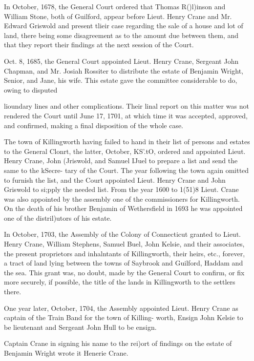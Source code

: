 \documentclass[oneside]{book}
\begin{document}
In October, 1678, the General Court ordered that Thomas 
R()l)inson and William Stone, both of Guilford, appear before 
Lieut. Henry Crane and Mr. Edward Griswold and present tlieir 
case regarding the sale of a house and lot of land, there being 
some disagreement as to the amount due between them, and that 
they report their findings at the next session of the Court. 

Oct. 8, 1685, the General Court appointed Lieut. Henry Crane, 
Sergeant John Chapman, and Mr. Josiah Rossiter to distribute 
the estate of Benjamin Wright, Senior, and Jane, his wife. This 
estate gave the committee considerable to do, owing to disputed 




lioundary lines and other complications. Their linal report on 
this matter was not rendered the Court until June 17, 1701, at 
which time it was accepted, approved, and confirmed, making a 
final disposition of the whole case. 

The town of Killingworth having failed to hand in their list of 
persons and estates to the General Clonrt, the latter, October, 
KS'.tO, ordered and appointed Lieut. Henry Crane, John (Jriswold, 
and Samuel IJuel to prepare a list and send the same to the kSecre- 
tary of the Court. The year following the town again omitted to 
furnish the list, and the Court appointed Lieut. Henry Crane and 
John Griswold to si;pply the needed list. From the year 1600 to 
1(51)8 Lieut. Crane was also appointed by the assembly one of the 
commissioners for Killingworth. On the death of his brother 
Benjamin of Wethersfield in 1693 he was appointed one of the 
distril)utors of his estate. 

In October, 1703, the Assembly of the Colony of Connecticut 
granted to Lieut. Henry Crane, William Stephens, Samuel Buel, 
John Kelsie, and their associates, the present proprietors and 
inhalntants of Killingworth, their heirs, etc., forever, a tract of 
land lying between the towns of Saybrook and Guilford, Haddam 
and the sea. This grant was, no doubt, made by the General 
Court to confirm, or fix more securely, if possible, the title of the 
lands in Killingworth to the settlers there. 

One year later, October, 1704, the Assembly appointed Lieut. 
Henry Crane as captain of the Train Band for the town of Killing- 
worth, Ensign John Kelsie to be lieutenant and Sergeant John 
Hull to be ensign. 

Captain Crane in signing his name to the rei)ort of findings on 
the estate of Benjamin Wright wrote it Henerie Crane. 
\end{document}

